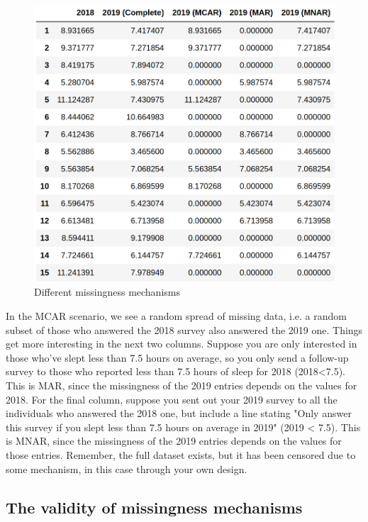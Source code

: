 \documentclass{article}
\begin{document}
	\begin{figure}
		\centering
		\includegraphics[width=\linewidth]{missingness}
		\caption{Different missingness mechanisms}
		\label{fig:miss1}
	\end{figure}
	
	In the MCAR scenario, we see a random spread of missing data, i.e. a random subset of those who answered the 2018 survey also answered the 2019 one. Things get more interesting in the next two columns. Suppose you are only interested in those who've slept less than 7.5 hours on average, so you only send a follow-up survey to those who reported less than 7.5 hours of sleep for 2018 (2018<7.5). This is MAR, since the missingness of the 2019 entries depends on the values for 2018. For the final column, suppose you sent out your 2019 survey to all the individuals who answered the 2018 one, but include a line stating "Only answer this survey if you slept less than 7.5 hours on average in 2019" (2019 < 7.5). This is MNAR, since the missingness of the 2019 entries depends on the values for those entries. Remember, the full dataset exists, but it has been censored due to some mechanism, in this case through your own design. 
	
	
	\subsection{The validity of missingness mechanisms}
	
\end{document}
